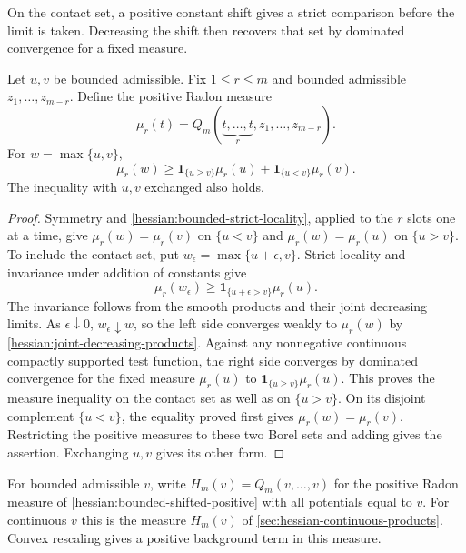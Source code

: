 On the contact set, a positive constant shift gives a strict comparison
before the limit is taken. Decreasing the shift then recovers that
set by dominated convergence for a fixed measure.

\begin{theorem}\label{hessian:bounded-maximum-measure}
Let $u,v$ be bounded admissible. Fix $1\leq r\leq m$ and bounded admissible
$z_1,\ldots,z_{m-r}$. Define the positive Radon measure
\[
 \mu_r(t)=Q_m(\underbrace{t,\ldots,t}_{r},z_1,\ldots,z_{m-r}).
\]
For $w=\max\{u,v\}$,
\[
 \mu_r(w)\geq\mathbf1_{\{u\geq v\}}\mu_r(u)
                  +\mathbf1_{\{u<v\}}\mu_r(v).
\]
The inequality with $u,v$ exchanged also holds.
\end{theorem}
\begin{proof}
Symmetry and \cref{hessian:bounded-strict-locality}, applied to the
$r$ slots one at a time, give
$\mu_r(w)=\mu_r(v)$ on $\{u<v\}$ and $\mu_r(w)=\mu_r(u)$ on $\{u>v\}$.
To include the contact set, put $w_\epsilon=\max\{u+\epsilon,v\}$.
Strict locality and invariance under addition of constants give
\[
 \mu_r(w_\epsilon)\geq
                   \mathbf1_{\{u+\epsilon>v\}}\mu_r(u).
\]
The invariance follows from the smooth products and their joint
decreasing limits. As $\epsilon\downarrow0$,
$w_\epsilon\downarrow w$, so the left side converges weakly to
$\mu_r(w)$ by \cref{hessian:joint-decreasing-products}. Against any nonnegative continuous compactly supported
test function, the right side converges by dominated convergence
for the fixed measure $\mu_r(u)$ to
$\mathbf1_{\{u\geq v\}}\mu_r(u)$. This proves the measure inequality
on the contact set as well as on $\{u>v\}$. On its disjoint
complement $\{u<v\}$, the equality proved first gives
$\mu_r(w)=\mu_r(v)$. Restricting the positive measures to these two Borel sets
and adding gives the assertion. Exchanging $u,v$ gives its other
form.
\end{proof}

For bounded admissible $v$, write $H_m(v)=Q_m(v,\ldots,v)$ for the
positive Radon measure of \cref{hessian:bounded-shifted-positive}
with all potentials equal to $v$. For continuous $v$ this is the
measure $H_m(v)$ of \cref{sec:hessian-continuous-products}.
Convex rescaling gives a positive background term in this measure.

